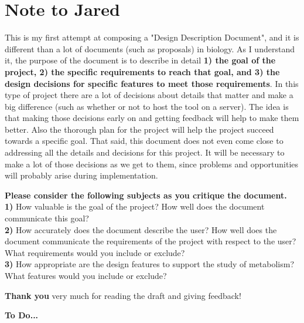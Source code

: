 

\section{Note to Jared}

This is my first attempt at composing a "Design Description Document", and it is different than a lot of documents (such as proposals) in biology.
As I understand it, the purpose of the document is to describe in detail \textbf{1) the goal of the project, 2) the specific requirements to reach that goal, and 3) the design decisions for specific features to meet those requirements}.
In this type of project there are a lot of decisions about details that matter and make a big difference (such as whether or not to host the tool on a server).
The idea is that making those decisions early on and getting feedback will help to make them better.
Also the thorough plan for the project will help the project succeed towards a specific goal.
That said, this document does not even come close to addressing all the details and decisions for this project.
It will be necessary to make a lot of those decisions as we get to them, since problems and opportunities will probably arise during implementation.


\vspace{1cm}


\textbf{Please consider the following subjects as you critique the document.}
\\ \textbf{1)} How valuable is the goal of the project? How well does the document communicate this goal?
\\ \textbf{2)} How accurately does the document describe the user? How well does the document communicate the requirements of the project with respect to the user? What requirements would you include or exclude?
\\ \textbf{3)} How appropriate are the design features to support the study of metabolism? What features would you include or exclude?

\vspace{1cm}

\textbf{Thank you} very much for reading the draft and giving feedback!

\vspace{1cm}

\textbf{To Do...}

\vspace{1cm}

